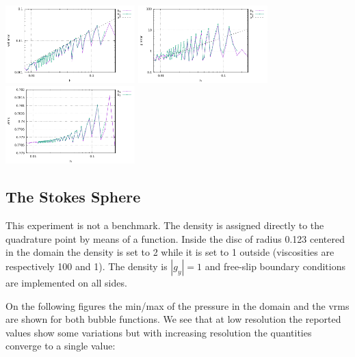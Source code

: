 \begin{center}
\includegraphics[width=5cm]{python_codes/fieldstone_72/results/solvi/errors_v}
\includegraphics[width=5cm]{python_codes/fieldstone_72/results/solvi/errors_p}
\includegraphics[width=5cm]{python_codes/fieldstone_72/results/solvi/vrms}
\end{center}



\subsection*{The Stokes Sphere}

This experiment is not a benchmark. The density is assigned directly to the 
quadrature point by means of a function. Inside the disc of radius 0.123 centered in the domain 
the density is set to 2 while it is set to 1 outside (viscosities are respectively 100 and 1). The density is $|g_y|=1$ and 
free-slip boundary conditions are implemented on all sides. 

On the following figures the min/max of the pressure in the domain and the vrms 
are shown for both bubble functions. We see that at low resolution the reported 
values show some variations but with increasing resolution the quantities converge to a single value:

